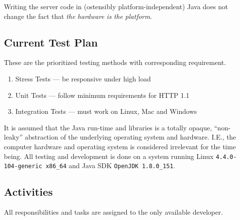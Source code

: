 Writing the server code in (ostensibly platform-independent) Java does not
change the fact that \emph{the hardware is the platform}\cite{mike-acton-three-big-lies}.


\subsection{Current Test Plan}
These are the prioritized testing methods with corresponding requirement.

\begin{enumerate}
  \item Stress Tests --- be responsive under high load
  \item Unit Tests --- follow minimum requirements for HTTP 1.1
  \item Integration Tests --- must work on Linux, Mac and Windows
\end{enumerate}

It is assumed that the Java run-time and libraries is a totally opaque,
``non-leaky'' abstraction of the underlying operating system and hardware.
I.E., the computer hardware and operating system is considered irrelevant for
the time being.
All testing and development is done on a system running Linux
\texttt{4.4.0-104-generic x86_64} and Java SDK \texttt{OpenJDK 1.8.0_151}.


\subsection{Activities}
All responsibilities and tasks are assigned to the only available developer.
